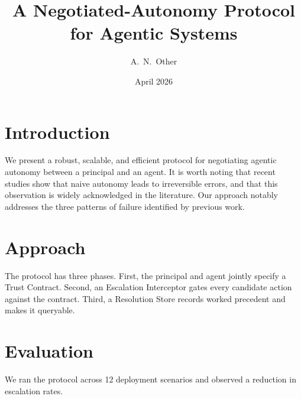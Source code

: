 \documentclass[11pt]{article}
\title{A Negotiated-Autonomy Protocol for Agentic Systems}
\author{A.\ N.\ Other}
\date{April 2026}
\begin{document}
\maketitle

\section{Introduction}

We present a robust, scalable, and efficient protocol for negotiating agentic autonomy between a principal and an agent.
It is worth noting that recent studies show that naive autonomy leads to irreversible errors, and that this observation is widely acknowledged in the literature.
Our approach notably addresses the three patterns of failure identified by previous work.

\section{Approach}

The protocol has three phases.
First, the principal and agent jointly specify a Trust Contract.
Second, an Escalation Interceptor gates every candidate action against the contract.
Third, a Resolution Store records worked precedent and makes it queryable.

\section{Evaluation}

We ran the protocol across 12 deployment scenarios and observed a reduction in escalation rates.
\end{document}
